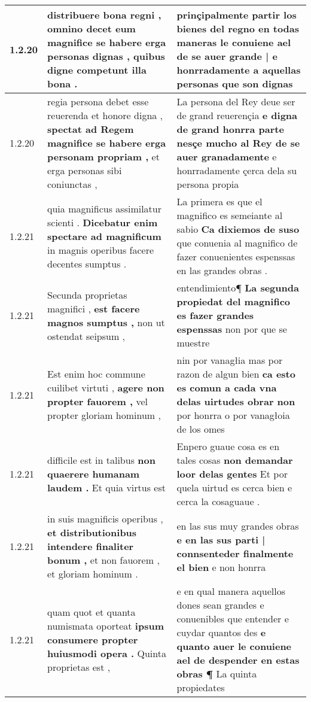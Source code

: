 \begin{tabular}{|p{1cm}|p{6.5cm}|p{6.5cm}|}
1.2.20 & distribuere bona regni , \textbf{ omnino decet eum magnifice se habere erga personas dignas , } quibus digne competunt illa bona . & prinçipalmente partir los bienes del regno \textbf{ en todas maneras le conuiene ael de se auer grande | e honrradamente a aquellas personas } que son dignas \\\hline
1.2.20 & regia persona debet esse reuerenda et honore digna , \textbf{ spectat ad Regem magnifice se habere erga personam propriam , } et erga personas sibi coniunctas , & La persona del Rey deue ser de grand reuerençia \textbf{ e digna de grand honrra parte nesçe mucho al Rey de se auer granadamente } e honrradamente çerca dela su persona propia \\\hline
1.2.21 & quia magnificus assimilatur scienti . \textbf{ Dicebatur enim spectare ad magnificum } in magnis operibus facere decentes sumptus . & La primera es que el magnifico es semeiante al sabio \textbf{ Ca dixiemos de suso } que conuenia al magnifico de fazer conuenientes espenssas en las grandes obras . \\\hline
1.2.21 & Secunda proprietas magnifici , \textbf{ est facere magnos sumptus , } non ut ostendat seipsum , & entendimiento¶ \textbf{ La segunda propiedat del magnifico es fazer grandes espenssas } non por que se muestre \\\hline
1.2.21 & Est enim hoc commune cuilibet virtuti , \textbf{ agere non propter fauorem , } vel propter gloriam hominum , & nin por vanagłia mas por razon de algun bien \textbf{ ca esto es comun a cada vna delas uirtudes obrar non } por honrra o por vanagłoia de los omes \\\hline
1.2.21 & difficile est in talibus \textbf{ non quaerere humanam laudem . } Et quia virtus est & Enpero guaue cosa es en tales cosas \textbf{ non demandar loor delas gentes } Et por quela uirtud es cerca bien e cerca la cosaguaue . \\\hline
1.2.21 & in suis magnificis operibus , \textbf{ et distributionibus intendere finaliter bonum , } et non fauorem , et gloriam hominum . & en las sus muy grandes obras \textbf{ e en las sus parti | connsenteder finalmente el bien } e non honrra \\\hline
1.2.21 & quam quot et quanta numismata oporteat \textbf{ ipsum consumere propter huiusmodi opera . } Quinta proprietas est , & e en qual manera aquellos dones sean grandes e conuenibles que entender e cuydar quantos des \textbf{ e quanto auer le conuiene ael de despender en estas obras ¶ } La quinta propiedates \\\hline

\end{tabular}
